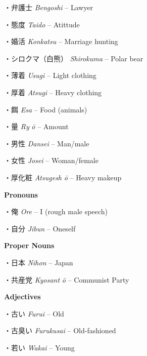 \par{・弁護士 \emph{Bengoshi }– Lawyer }
 
\par{・態度 \emph{Taido }– Atittude }
 
\par{・婚活 \emph{Konkatsu }– Marriage hunting }
 
\par{・シロクマ（白熊） \emph{Shirokuma }– Polar bear }
 
\par{・薄着 \emph{Usugi }– Light clothing }
 
\par{・厚着 \emph{Atsugi }– Heavy clothing }
 
\par{・餌 \emph{Esa }– Food (animal\textquotesingle s) }
 
\par{・量 \emph{Ry }\emph{ō }– Amount }
 
\par{・男性 \emph{Dansei }– Man\slash male }
 
\par{・女性 \emph{Josei }– Woman\slash female }
 
\par{・厚化粧 \emph{Atsugesh }\emph{ō }– Heavy makeup }
 
\par{\textbf{Pronouns }}
 
\par{・俺 \emph{Ore }– I (rough male speech) }
 
\par{・自分 \emph{Jibun }– Oneself }
 
\par{\textbf{Proper Nouns }}
 
\par{・日本 \emph{Nihon }– Japan }
 
\par{・共産党 \emph{Kyosant }\emph{ō }– Communist Party }
 
\par{\textbf{Adjectives }}
 
\par{・古い \emph{Furui }– Old }
 
\par{・古臭い \emph{Furukusai }– Old-fashioned }
 
\par{・若い \emph{Wakai }– Young }
 
